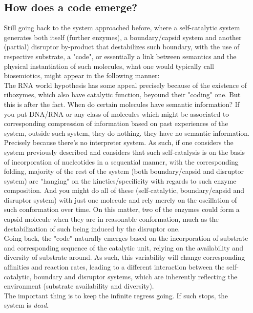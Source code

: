\documentclass[a4paper,12pt,twoside,leqno]{article}
\begin{document}
\subsection*{How does a code emerge?}
Still going back to the system approached before, where a self-catalytic system generates both itself (further enzymes), a boundary/capsid system and another (partial) disruptor by-product that destabilizes such boundary, with the use of respective substrate, a "code", or essentially a link between semantics and the physical instantiation of such molecules, what one would typically call biosemiotics, might appear in the following manner:\\
The RNA world hypothesis has some appeal precisely because of the existence of ribozymes, which also have catalytic function, beyound their "coding" one. But this is after the fact. When do certain molecules have semantic information? If you put DNA/RNA or any class of molecules which might be associated to corresponding compression of information based on past experiences of the system, outside such system, they do nothing, they have no semantic information. Precisely because there's no interpreter system. As such, if one considers the system previously described and considers that such self-catalysis is on the basis of incorporation of nucleotides in a sequential manner, with the corresponding folding, majority of the rest of the system (both boundary/capsid and disruptor system) are "hanging" on the kinetics/specificity with regards to such enzyme composition. And you might do all of these (self-catalytic, boundary/capsid and disruptor system) with just one molecule and rely merely on the oscillation of such conformation over time. On this matter, two of the enzymes could form a capsid molecule when they are in reasonable conformation, much as the destabilization of such being induced by the disruptor one.\\
Going back, the "code" naturally emerges based on the incorporation of substrate and corresponding sequence of the catalytic unit, relying on the availability and diversity of substrate around. As such, this variability will change corresponding affinities and reaction rates, leading to a different interaction between the self-catalytic, boundary and disruptor systems, which are inherently reflecting the environment (substrate availability and diversity).\\
The important thing is to keep the infinite regress going. If such stops, the system is \textit{dead}.
\end{document}

